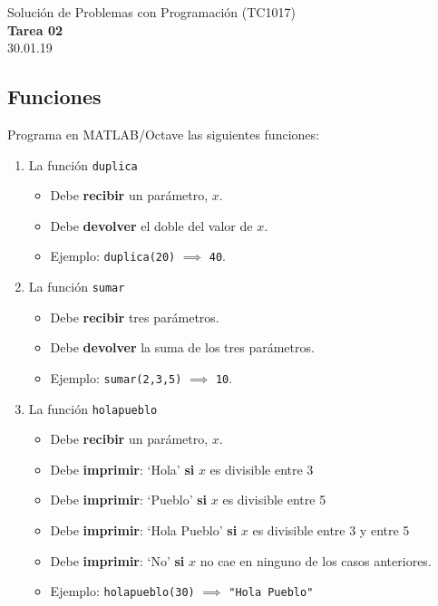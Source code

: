 \documentclass[]{book}
\newcommand{\matlab}[1]{\lstinline[style=Matlab-pyglike]!#1!}
\theoremstyle{definition}
\begin{document}
\begin{center}
{\huge Solución de Problemas con Programación (TC1017)}\\[1.5ex]
{\large \textbf{Tarea 02}\\[1.5ex] %
30.01.19} %
\end{center}

\vspace{0.2 cm}

\subsection*{Funciones}

Programa en MATLAB/Octave las siguientes funciones:

\begin{enumerate}[label=\alph*)]
    \itemsep2.5ex
    \item La función \matlab{duplica}
    \begin{itemize}
        \item Debe \textbf{recibir} un parámetro, $x$.
        \item Debe \textbf{devolver} el doble del valor de $x$.
        \item Ejemplo: \matlab{duplica(20)} $\implies$ \matlab{40}.
    \end{itemize}
    \item La función \matlab{sumar}
    \begin{itemize}
        \item Debe \textbf{recibir} tres parámetros.
        \item Debe \textbf{devolver} la suma de los tres parámetros.
        \item Ejemplo: \matlab{sumar(2,3,5)} $\implies$ \matlab{10}.
    \end{itemize}
    \item La función \matlab{holapueblo}
    \begin{itemize}
        \item Debe \textbf{recibir} un parámetro, $x$.
        \item Debe \textbf{imprimir}: `Hola' \textbf{si} $x$ es divisible entre 3
        \item Debe \textbf{imprimir}: `Pueblo' \textbf{si} $x$ es divisible entre 5
        \item Debe \textbf{imprimir}: `Hola Pueblo' \textbf{si} $x$ es divisible entre 3 y entre 5
        \item Debe \textbf{imprimir}: `No' \textbf{si} $x$ no cae en ninguno de los casos anteriores.
        \item Ejemplo: \matlab{holapueblo(30)} $\implies$ \texttt{"Hola Pueblo"}
    \end{itemize}
\end{enumerate}
\end{document}

